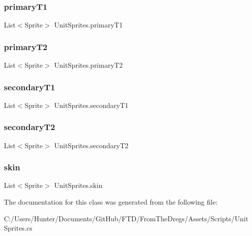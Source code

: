 \subsubsection{\texorpdfstring{primaryT1}{primaryT1}}
{\footnotesize\ttfamily List$<$Sprite$>$ Unit\+Sprites.\+primary\+T1}

\mbox{\label{class_unit_sprites_a2991644582def68ae1ab58e7f887acb8}} 
\subsubsection{\texorpdfstring{primaryT2}{primaryT2}}
{\footnotesize\ttfamily List$<$Sprite$>$ Unit\+Sprites.\+primary\+T2}

\mbox{\label{class_unit_sprites_ad5ba8963e97a5efd3bb56be95e573b1e}} 
\subsubsection{\texorpdfstring{secondaryT1}{secondaryT1}}
{\footnotesize\ttfamily List$<$Sprite$>$ Unit\+Sprites.\+secondary\+T1}

\mbox{\label{class_unit_sprites_afce363dd582be88b65df9b081a932400}} 
\subsubsection{\texorpdfstring{secondaryT2}{secondaryT2}}
{\footnotesize\ttfamily List$<$Sprite$>$ Unit\+Sprites.\+secondary\+T2}

\mbox{\label{class_unit_sprites_a0fb8aecfe21f48454c0ff88e3e62b46b}} 
\subsubsection{\texorpdfstring{skin}{skin}}
{\footnotesize\ttfamily List$<$Sprite$>$ Unit\+Sprites.\+skin}



The documentation for this class was generated from the following file\+:\begin{DoxyCompactItemize}
\item 
C\+:/\+Users/\+Hunter/\+Documents/\+Git\+Hub/\+F\+T\+D/\+From\+The\+Dregs/\+Assets/\+Scripts/Unit\+Sprites.\+cs\end{DoxyCompactItemize}
